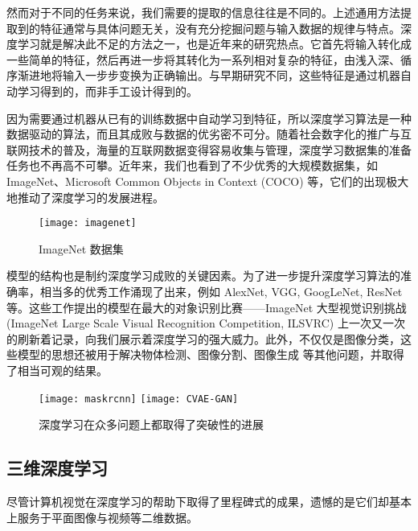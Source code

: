 然而对于不同的任务来说，我们需要的提取的信息往往是不同的。上述通用方法提取到的特征通常与具体问题无关，没有充分挖掘问题与输入数据的规律与特点。深度学习就是解决此不足的方法之一，也是近年来的研究热点。它首先将输入转化成一些简单的特征，然后再进一步将其转化为一系列相对复杂的特征，由浅入深、循序渐进地将输入一步步变换为正确输出。与早期研究不同，这些特征是通过机器自动学习得到的，而非手工设计得到的。

因为需要通过机器从已有的训练数据中自动学习到特征，所以深度学习算法是一种数据驱动的算法，而且其成败与数据的优劣密不可分。随着社会数字化的推广与互联网技术的普及，海量的互联网数据变得容易收集与管理，深度学习数据集的准备任务也不再高不可攀。近年来，我们也看到了不少优秀的大规模数据集，如 ImageNet\cite{imagenet}、Microsoft Common Objects in Context (COCO) \cite{coco}等，它们的出现极大地推动了深度学习的发展进程。



\begin{figure}[H]
	\centering
	\texttt{[image: imagenet]}
	\caption{ImageNet 数据集 \cite{imagenet}}
\end{figure}

模型的结构也是制约深度学习成败的关键因素。为了进一步提升深度学习算法的准确率，相当多的优秀工作涌现了出来，例如 AlexNet\cite{alexnet}, VGG\cite{vgg}, GoogLeNet\cite{googlenet}, ResNet\cite{resnet} 等。这些工作提出的模型在最大的对象识别比赛——ImageNet 大型视觉识别挑战 (ImageNet Large Scale Visual Recognition Competition, ILSVRC) 上一次又一次的刷新着记录，向我们展示着深度学习的强大威力。此外，不仅仅是图像分类，这些模型的思想还被用于解决物体检测\cite{rcnn, fastrcnn, fasterrcnn, ssd, yolo}、图像分割\cite{maskrcnn, fcn}、图像生成
\cite{gan, dcgan, wgan, wgangp, lsgan, began, pggan, sngan, cvaegan}等其他问题，并取得了相当可观的结果。

\begin{figure}[h]
	\centering%
	{\texttt{[image: maskrcnn]}}%
	\hspace{2em}%
	{\texttt{[image: CVAE-GAN]}}
	\caption{深度学习在众多问题上都取得了突破性的进展}
\end{figure}

\subsection{三维深度学习}

尽管计算机视觉在深度学习的帮助下取得了里程碑式的成果，遗憾的是它们却基本上服务于平面图像与视频等二维数据。

